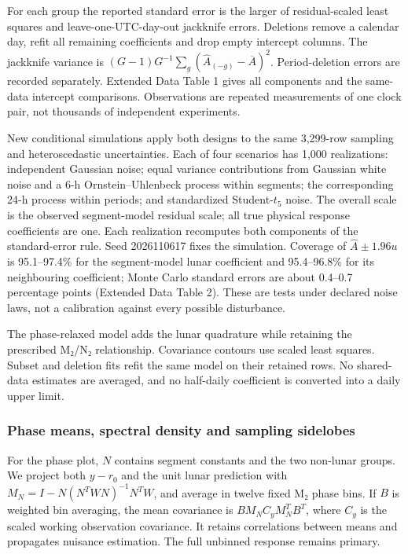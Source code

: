 \documentclass[
  10pt,
  a4paper,
]{article}
\begin{document}
For each group the reported standard error is the larger of
residual-scaled least squares and leave-one-UTC-day-out jackknife
errors. Deletions remove a calendar day, refit all remaining
coefficients and drop empty intercept columns. The jackknife variance is
\((G-1)G^{-1}\sum_g(\hat A_{(-g)}-\overline A)^2\). Period-deletion
errors are recorded separately. Extended Data Table 1 gives all
components and the same-data intercept comparisons. Observations are
repeated measurements of one clock pair, not thousands of independent
experiments.

New conditional simulations apply both designs to the same 3,299-row
sampling and heteroscedastic uncertainties. Each of four scenarios has
1,000 realizations: independent Gaussian noise; equal variance
contributions from Gaussian white noise and a 6-h Ornstein--Uhlenbeck
process within segments; the corresponding 24-h process within periods;
and standardized Student-\(t_5\) noise. The overall scale is the
observed segment-model residual scale; all true physical response
coefficients are one. Each realization recomputes both components of the
standard-error rule. Seed 2026110617 fixes the simulation. Coverage of
\(\hat A\pm1.96u\) is 95.1--97.4\% for the segment-model lunar
coefficient and 95.4--96.8\% for its neighbouring coefficient; Monte
Carlo standard errors are about 0.4--0.7 percentage points (Extended
Data Table 2). These are tests under declared noise laws, not a
calibration against every possible disturbance.

The phase-relaxed model adds the lunar quadrature while retaining the
prescribed M₂/N₂ relationship. Covariance contours use scaled least
squares. Subset and deletion fits refit the same model on their retained
rows. No shared-data estimates are averaged, and no half-daily
coefficient is converted into a daily upper limit.

\hypertarget{phase-means-spectral-density-and-sampling-sidelobes}{%
\subsubsection{Phase means, spectral density and sampling
sidelobes}\label{phase-means-spectral-density-and-sampling-sidelobes}}

For the phase plot, \(N\) contains segment constants and the two
non-lunar groups. We project both \(y-r_0\) and the unit lunar
prediction with \(M_N=I-N(N^TWN)^{-1}N^TW\), and average in twelve fixed
M₂ phase bins. If \(B\) is weighted bin averaging, the mean covariance
is \(BM_NC_yM_N^TB^T\), where \(C_y\) is the scaled working observation
covariance. It retains correlations between means and propagates
nuisance estimation. The full unbinned response remains primary.
\end{document}
